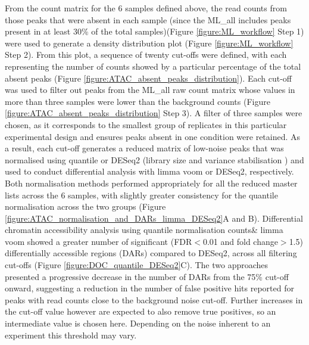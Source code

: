 From the count matrix for the 6 samples defined above, the read counts from those peaks that were absent in each sample (since the  ML\_all includes peaks present in at least 30\% of the total samples)(Figure \ref{figure:ML_workflow} Step 1) were used to generate a density distribution plot (Figure \ref{figure:ML_workflow} Step 2). From this plot, a sequence of twenty cut-offs were defined, with each representing the number of counts showed by a particular percentage of the total absent peaks (Figure \ref{figure:ATAC_absent_peaks_distribution}). Each cut-off was used to filter out peaks from the ML\_all raw count matrix whose values in more than three samples were lower than the background counts (Figure \ref{figure:ATAC_absent_peaks_distribution} Step 3). A filter of three samples were chosen, as it corresponds to the smallest group of replicates in this particular experimental design and ensures peaks absent in one condition were retained. As a result, each cut-off generates a reduced matrix of low-noise peaks that was normalised using quantile or DESeq2 (library size and variance stabilisation \parencite{Love2014}) and used to conduct differential analysis with limma voom or DESeq2, respectively. Both normalisation methods performed appropriately for all the reduced master lists across the 6 samples, with slightly greater consistency for the quantile normalisation across the two groups (Figure \ref{figure:ATAC_normalisation_and_DARs_limma_DESeq2}A and B). Differential chromatin accessibility analysis using quantile normalisation counts\& limma voom showed a greater number of significant (FDR$<$0.01 and fold change$>$1.5) differentially accessible regions (DARs) compared to DESeq2, across all filtering cut-offs (Figure \ref{figure:DOC_quantile_DESeq2}C). The two approaches presented a progressive decrease in the number of DARs from the 75\% cut-off onward, suggesting a reduction in the number of false positive hits reported for peaks with read counts close to the background noise cut-off. Further increases in the cut-off value however are expected to also remove true positives, so an intermediate value is chosen here. Depending on the noise inherent to an experiment this threshold may vary. 

